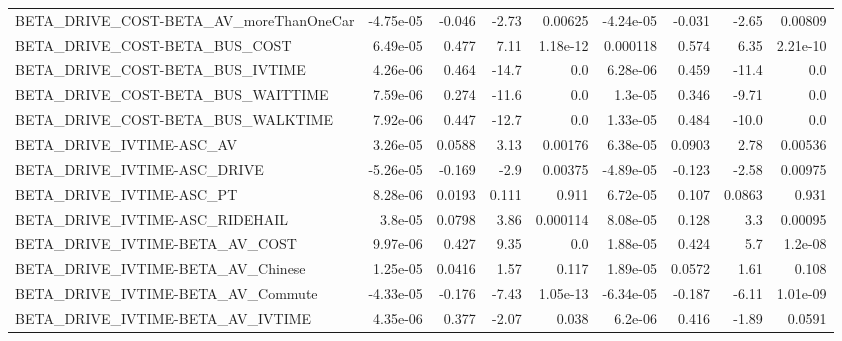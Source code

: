 \begin{tabular}{lrrrrrrrr}
BETA\_DRIVE\_COST-BETA\_AV\_moreThanOneCar             &   -4.75e-05 &       -0.046 &     -2.73 &  0.00625 &  -4.24e-05 &      -0.031 &        -2.65 &       0.00809 \\
BETA\_DRIVE\_COST-BETA\_BUS\_COST                      &    6.49e-05 &        0.477 &      7.11 & 1.18e-12 &   0.000118 &       0.574 &         6.35 &      2.21e-10 \\
BETA\_DRIVE\_COST-BETA\_BUS\_IVTIME                    &    4.26e-06 &        0.464 &     -14.7 &      0.0 &   6.28e-06 &       0.459 &        -11.4 &           0.0 \\
BETA\_DRIVE\_COST-BETA\_BUS\_WAITTIME                  &    7.59e-06 &        0.274 &     -11.6 &      0.0 &    1.3e-05 &       0.346 &        -9.71 &           0.0 \\
BETA\_DRIVE\_COST-BETA\_BUS\_WALKTIME                  &    7.92e-06 &        0.447 &     -12.7 &      0.0 &   1.33e-05 &       0.484 &        -10.0 &           0.0 \\
BETA\_DRIVE\_IVTIME-ASC\_AV                           &    3.26e-05 &       0.0588 &      3.13 &  0.00176 &   6.38e-05 &      0.0903 &         2.78 &       0.00536 \\
BETA\_DRIVE\_IVTIME-ASC\_DRIVE                        &   -5.26e-05 &       -0.169 &      -2.9 &  0.00375 &  -4.89e-05 &      -0.123 &        -2.58 &       0.00975 \\
BETA\_DRIVE\_IVTIME-ASC\_PT                           &    8.28e-06 &       0.0193 &     0.111 &    0.911 &   6.72e-05 &       0.107 &       0.0863 &         0.931 \\
BETA\_DRIVE\_IVTIME-ASC\_RIDEHAIL                     &     3.8e-05 &       0.0798 &      3.86 & 0.000114 &   8.08e-05 &       0.128 &          3.3 &       0.00095 \\
BETA\_DRIVE\_IVTIME-BETA\_AV\_COST                     &    9.97e-06 &        0.427 &      9.35 &      0.0 &   1.88e-05 &       0.424 &          5.7 &       1.2e-08 \\
BETA\_DRIVE\_IVTIME-BETA\_AV\_Chinese                  &    1.25e-05 &       0.0416 &      1.57 &    0.117 &   1.89e-05 &      0.0572 &         1.61 &         0.108 \\
BETA\_DRIVE\_IVTIME-BETA\_AV\_Commute                  &   -4.33e-05 &       -0.176 &     -7.43 & 1.05e-13 &  -6.34e-05 &      -0.187 &        -6.11 &      1.01e-09 \\
BETA\_DRIVE\_IVTIME-BETA\_AV\_IVTIME                   &    4.35e-06 &        0.377 &     -2.07 &    0.038 &    6.2e-06 &       0.416 &        -1.89 &        0.0591 \\

\end{tabular}
